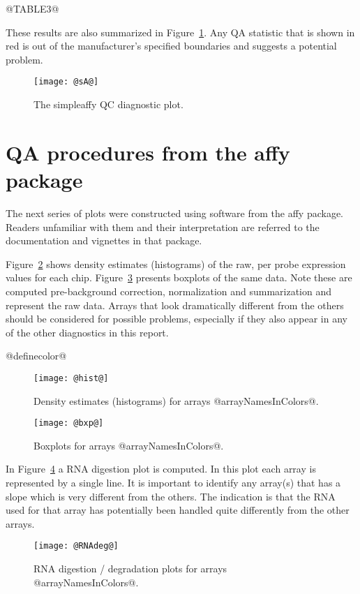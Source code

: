 \documentclass[11pt]{article}
\newcommand{\Rpackage}[1]{{\textsf{#1}}}
\begin{document}
@TABLE3@

These results are also summarized in Figure~\ref{fig:sA}. Any QA statistic
that is shown in red is out of the manufacturer's specified boundaries
and suggests a potential problem.


\begin{figure}[tp]
  \centering
\texttt{[image: @sA@]}

\caption{\label{fig:sA}%
The \Rpackage{simpleaffy} QC diagnostic plot.}
\end{figure}

\section{QA procedures from the \Rpackage{affy} package}

The next series of plots were constructed using software from the 
\Rpackage{affy} package. Readers unfamiliar with them and their
interpretation are referred to the documentation and vignettes in
that package.

Figure~\ref{fig:hist} shows density estimates (histograms) of the raw, 
per probe expression values for each chip. Figure~\ref{fig:bxp}
presents boxplots of the same data.  Note these are computed pre-background
correction, normalization and summarization and represent the raw
data. Arrays that look dramatically different from the others should be 
considered for possible problems, especially if they also appear in any
of the other diagnostics in this report.

@definecolor@

\begin{figure}[tp]
  \centering
\texttt{[image: @hist@]}
\caption{\label{fig:hist}%
Density estimates (histograms) for arrays @arrayNamesInColors@.}
\end{figure}

\begin{figure}[tp]
  \centering
\texttt{[image: @bxp@]}
\caption{\label{fig:bxp}%
Boxplots for arrays @arrayNamesInColors@.}
\end{figure}


In Figure~\ref{fig:rnadeg} a RNA digestion plot is computed. In this plot
each array is represented by a single line. It is important to identify 
any array(s) that has a slope which is very different from the others. 
The indication is that the RNA used for that array has potentially 
been handled quite differently from the other arrays. 

\begin{figure}[tp]
  \centering
\texttt{[image: @RNAdeg@]}
\caption{\label{fig:rnadeg}%
RNA digestion / degradation plots for arrays @arrayNamesInColors@.}
\end{figure}
\end{document}
